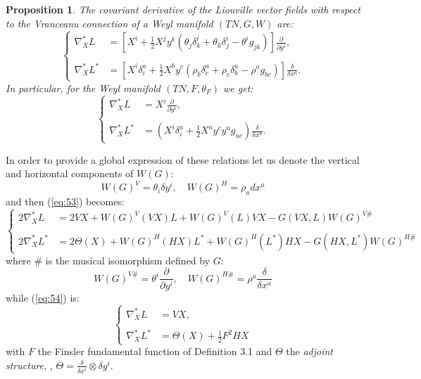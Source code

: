 \documentclass[11pt,oneside,english]{amsart}
\numberwithin{equation}{section}
\numberwithin{figure}{section}
\theoremstyle{plain}
\theoremstyle{definition}
\theoremstyle{definition}
\theoremstyle{plain}
\newtheorem{prop}[thm]{Proposition}
\theoremstyle{plain}
\theoremstyle{remark}
\theoremstyle{remark}
\begin{document}
\medskip{}

\begin{prop}
The covariant derivative of the Liouville vector fields with respect
to the Vranceanu connection of a Weyl manifold $(TN,G,W)$ are: \begin{equation}
\left\{ \begin{array}{ll}
\nabla_{X}^{*}L & =\left[X^{i}+\frac{1}{2}X^{j}y^{k}(\theta_{j}\delta_{k}^{i}+\theta_{k}\delta_{j}^{i}-\theta^{i}g_{jk})\right]\frac{\partial}{\partial y^{i}},\\
\\\nabla_{X}^{*}L^{*} & =\left[X^{i}\delta_{i}^{a}+\frac{1}{2}X^{b}y^{c}\left(\rho_{b}\delta_{c}^{a}+\rho_{c}\delta_{b}^{a}-\rho^{a}g_{bc}\right)\right]\frac{\delta}{\delta x^{a}}.\end{array}\right.\label{eq:53}\end{equation}
 In particular, for the Weyl manifold $(TN,F,\theta_{F})$ we get:
\begin{equation}
\left\{ \begin{array}{ll}
\nabla_{X}^{*}L & =X^{i}\frac{\partial}{\partial y^{i}},\\
\\\nabla_{X}^{*}L^{*} & =\left(X^{i}\delta_{i}^{a}+\frac{1}{2}X^{a}y^{c}y^{u}g_{uc}\right)\frac{\delta}{\delta x^{a}}.\end{array}\right.\label{eq:54}\end{equation}

\end{prop}
In order to provide a global expression of these relations let us
denote the vertical and horizontal components of $W(G)$: \begin{equation}
W(G)^{V}=\theta_{i}\delta y^{i},\quad W(G)^{H}=\rho_{a}dx^{a}\label{eq:55}\end{equation}
 and then (\ref{eq:53}) becomes: \[
\left\{ \begin{array}{ll}
2\nabla_{X}^{*}L & =2VX+W(G)^{V}(VX)L+W(G)^{V}(L)VX-G(VX,L)W(G)^{V\#}\\
\\2\nabla_{X}^{*}L^{*} & =2\Theta(X)+W(G)^{H}(HX)L^{*}+W(G)^{H}(L^{*})HX-G(HX,L^{*})W(G)^{H\#}\end{array}\right.\]
 where $\#$ is the musical isomorphism defined by $G$: \begin{equation}
W(G)^{V\#}=\theta^{i}\frac{\partial}{\partial y^{i}},\quad W(G)^{H\#}=\rho^{a}\frac{\delta}{\delta x^{a}}\label{eq:56}\end{equation}
 while (\ref{eq:54}) is: \begin{equation}
\left\{ \begin{array}{ll}
\nabla_{X}^{*}L & =VX,\\
\\\nabla_{X}^{*}L^{*} & =\Theta(X)+\frac{1}{2}F^{2}HX\end{array}\right.\label{eq:57}\end{equation}
 with $F$ the Finsler fundamental function of Definition 3.1 and
$\Theta$ the \textit{adjoint structure,} \cite[p. 991]{m:ab}, $\Theta=\frac{\delta}{\delta x^{i}}\otimes\delta y^{i}$.
\end{document}
